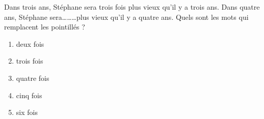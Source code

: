 Dans trois ans, Stéphane sera trois fois plus vieux qu'il y a trois ans. Dans quatre ans, Stéphane sera\ldots\ldots\ldots plus vieux qu'il y a quatre ans. Quels sont les mots qui remplacent les pointillés ?
\begin{multicols}{5}
  \begin{enumerate}[A/]
  \item deux fois
  \item trois fois
  \item quatre fois
  \item cinq fois
  \item six fois
  \end{enumerate}
\end{multicols}